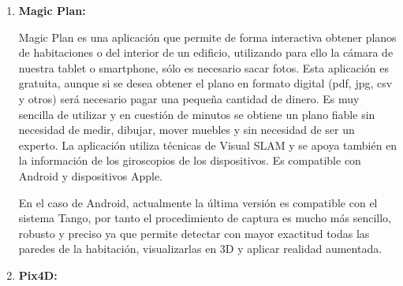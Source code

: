 \begin {enumerate}
\clearpage

\item \textbf{Magic Plan:}

Magic Plan es una aplicación que permite de forma interactiva obtener planos de habitaciones o del interior de un edificio, utilizando para ello la cámara de nuestra tablet o smartphone, sólo es necesario sacar fotos. Esta aplicación es gratuita, aunque si se desea obtener el plano en formato digital (pdf, jpg, csv y otros) será necesario pagar una pequeña cantidad de dinero.
Es muy sencilla de utilizar y en cuestión de minutos se obtiene un plano fiable sin necesidad de medir, dibujar, mover muebles  y sin necesidad de ser un experto.
La aplicación utiliza técnicas de Visual SLAM y se apoya también en la información de los giroscopios de los dispositivos. Es compatible con Android y dispositivos Apple.

En el caso de Android, actualmente la última versión es compatible con el sistema Tango, por tanto el procedimiento de captura es mucho más sencillo, robusto y preciso  ya que  permite detectar con mayor exactitud todas las paredes de la habitación, visualizarlas en 3D y aplicar realidad aumentada.



\item \textbf{Pix4D:}


\end{enumerate}
